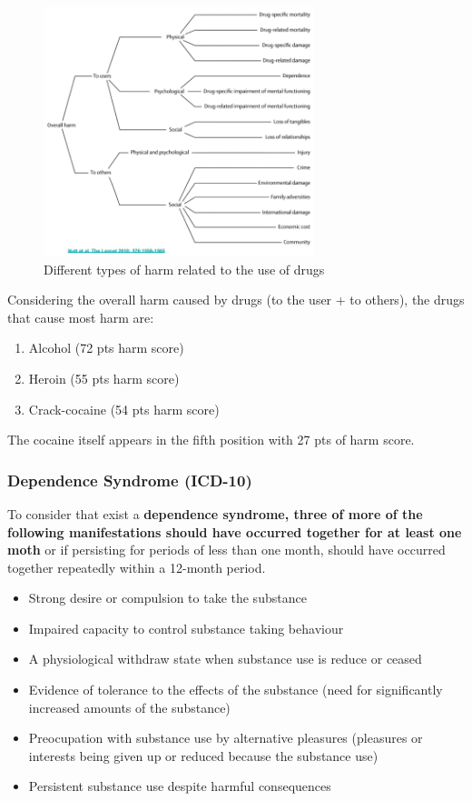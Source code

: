 \documentclass[12pt,article,oneside,a4paper]{memoir}
\begin{document}
\begin{figure}
  \centering
  \includegraphics[width=0.7\textwidth]{imgs/harm-drugs.png}
  \caption{Different types of harm related to the use of drugs}
  \label{fig:harm-drugs}
\end{figure}

Considering the overall harm caused by drugs (to the user + to others), the
drugs that cause most harm are: 
\begin{enumerate}
\item Alcohol (72 pts harm score)
\item Heroin (55 pts harm score)
\item Crack-cocaine (54 pts harm score)
\end{enumerate}
The cocaine itself appears in the fifth position with 27 pts of harm score.

\subsubsection{Dependence Syndrome (ICD-10)} 
To consider that exist a \textbf{dependence syndrome, three of more of the
following manifestations should have occurred together for at least one moth}
or if persisting for periods of less than one month, should have occurred
together repeatedly within a 12-month period.

\begin{itemize}
\item Strong desire or compulsion to take the substance
\item Impaired capacity to control substance taking behaviour
\item A physiological withdraw state when substance use is reduce or ceased
\item Evidence of tolerance to the effects of the substance (need for
significantly increased amounts of the substance)
\item Preocupation with substance use by alternative pleasures (pleasures or
interests being given up or reduced because the substance use)
\item Persistent substance use despite harmful consequences
\end{itemize}
\end{document}
